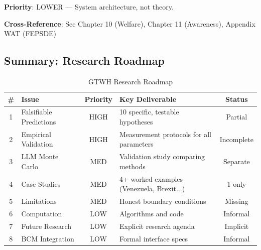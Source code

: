 \begin{tcolorbox}[colback=green!5!white, colframe=green!75!black, title=Status: Informal References Only]
\textbf{Priority}: \colorbox{green!20}{LOWER} --- System architecture, not theory.

\textbf{Cross-Reference}: See Chapter 10 (Welfare), Chapter 11 (Awareness), Appendix WAT (FEPSDE)
\end{tcolorbox}

\subsection{Summary: Research Roadmap}

\begin{table}[htbp]
\centering
\caption{GTWH Research Roadmap}
\label{tab:aaa-roadmap}
\renewcommand{\arraystretch}{1.3}
\small
\begin{tabular}{@{}clcp{5cm}c@{}}
\toprule
\textbf{\#} & \textbf{Issue} & \textbf{Priority} & \textbf{Key Deliverable} & \textbf{Status} \\
\midrule
1 & Falsifiable Predictions & \colorbox{red!20}{HIGH} & 10 specific, testable hypotheses & Partial \\
2 & Empirical Validation & \colorbox{red!20}{HIGH} & Measurement protocols for all parameters & Incomplete \\
3 & LLM Monte Carlo & \colorbox{yellow!20}{MED} & Validation study comparing methods & Separate \\
4 & Case Studies & \colorbox{yellow!20}{MED} & 4+ worked examples (Venezuela, Brexit...) & 1 only \\
5 & Limitations & \colorbox{yellow!20}{MED} & Honest boundary conditions & Missing \\
6 & Computation & \colorbox{green!20}{LOW} & Algorithms and code & Informal \\
7 & Future Research & \colorbox{green!20}{LOW} & Explicit research agenda & Implicit \\
8 & BCM Integration & \colorbox{green!20}{LOW} & Formal interface specs & Informal \\
\bottomrule
\end{tabular}
\end{table}


